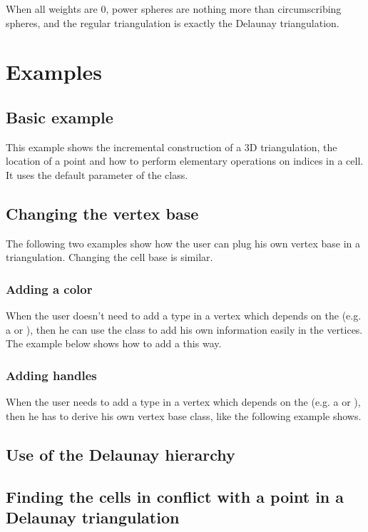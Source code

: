 When all weights are 0, power spheres are nothing more than
circumscribing spheres, and the regular triangulation is exactly the
Delaunay triangulation.


\section{Examples}
\label{Triangulation3-sec-examples}
\subsection{Basic example}
This example shows the incremental construction of a 3D triangulation, the
location of a point and how to perform elementary operations on indices in a
cell. It uses the default parameter of the  class.


\subsection{Changing the vertex base}
The following two examples show how the user can plug his own vertex base in a
triangulation.  Changing the cell base is similar.

\subsubsection{Adding a color}
When the user doesn't need to add a type in a vertex which depends on the
 (e.g. a  or
), then he can use the
 class to add his own information
easily in the vertices.  The example below shows how to add a 
this way.


\subsubsection{Adding handles}
When the user needs to add a type in a vertex which depends on the
 (e.g. a  or
), then he has to derive his own vertex base class,
like the following example shows.


\subsection{Use of the Delaunay hierarchy}


\subsection{Finding the cells in conflict with a point in a Delaunay
triangulation}


